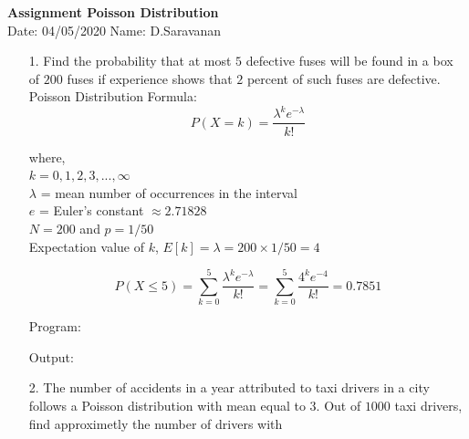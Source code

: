 \documentclass[a4paper,10pt,openright]{report}
\begin{document}
\singlespacing
\pagestyle{plain}

\begin{center}
\textbf{Assignment Poisson Distribution} \\
Date: 04/05/2020 \hspace{2mm} Name: D.Saravanan
\end{center}

\vspace{10px}

\begin{enumerate}

\item[1.] Find the probability that at most $5$ defective fuses will be found in a box of 
$200$ fuses if experience shows that $2$ percent of such fuses are defective. \\

Poisson Distribution Formula:
\begin{equation*}
P(X = k) = \frac{\lambda^{k} e^{-\lambda}}{k!}
\end{equation*}

where, \\
$k = 0, 1, 2, 3,..., \infty$\\
$\lambda$ = mean number of occurrences in the interval \\
$e$ = Euler's constant $\approx 2.71828$ \\


$N = 200$ and $p = 1/50$ \\
Expectation value of $k$, $E[k] = \lambda = 200 \times 1/50 = 4$



\begin{equation*}
P(X \leq 5)  = \sum_{k=0}^{5} \frac{\lambda^{k} e^{-\lambda}}{k!}
		     = \sum_{k=0}^{5} \frac{4^{k} e^{-4}}{k!}
			 = 0.7851
\end{equation*}

Program:


Output:


\vspace{1cm}

\item[2.] The number of accidents in a year attributed to taxi drivers in a city follows a
Poisson distribution with mean equal to $3$. Out of $1000$ taxi drivers, find approximetly
the number of drivers with \\

\begin{enumerate}


\end{enumerate}
\end{enumerate}
\end{document}
